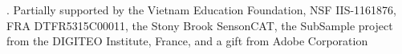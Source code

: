 \documentclass[runningheads]{llncs}
\begin{document}
. Partially supported by the Vietnam Education Foundation, NSF IIS-1161876, FRA DTFR5315C00011,  the Stony Brook SensonCAT, the SubSample project from the DIGITEO Institute, France, and a gift from Adobe Corporation
\FloatBarrier



\vspace{3mm}





\end{document}
